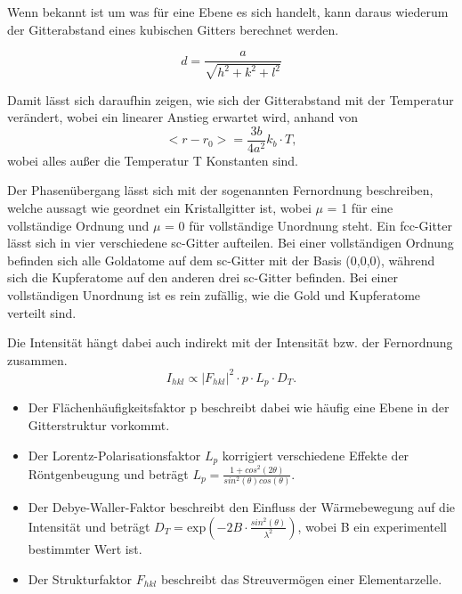 \documentclass[
	a4paper,
	12pt,
	pagesize,
	ngerman
]{scrartcl}
\begin{document}
Wenn bekannt ist um was für eine Ebene es sich handelt, kann daraus wiederum der Gitterabstand eines kubischen Gitters berechnet werden.

\begin{equation}
d = \frac{a}{\sqrt{h^{2}+k^{2}+l^{2}}}
\label{d}
\end{equation}

Damit lässt sich daraufhin zeigen, wie sich der Gitterabstand mit der Temperatur verändert, wobei ein linearer Anstieg erwartet wird, anhand von 
\begin{equation}
<r-r_{0}> = \frac{3 b}{4 a^{2}} k_{b} \cdot T, 
\label{Temp}
\end{equation}
wobei alles außer die Temperatur T Konstanten sind.

Der Phasenübergang lässt sich mit der sogenannten Fernordnung beschreiben, welche aussagt wie geordnet ein Kristallgitter ist, wobei $\mu$ = 1 für eine vollständige Ordnung und $\mu$ = 0 für vollständige Unordnung steht. Ein fcc-Gitter lässt sich in vier verschiedene sc-Gitter aufteilen. Bei einer vollständigen Ordnung befinden sich alle Goldatome auf dem sc-Gitter mit der Basis (0,0,0), während sich die Kupferatome auf den anderen drei sc-Gitter befinden.
Bei einer vollständigen Unordnung ist es rein zufällig, wie die Gold und Kupferatome verteilt sind.

Die Intensität hängt dabei auch indirekt mit der Intensität bzw. der Fernordnung zusammen.
\begin{equation}
I_{hkl} \propto |F_{hkl}|^{2} \cdot p \cdot L_{p} \cdot D_{T}.
\end{equation}

\begin{itemize}


\item Der Flächenhäufigkeitsfaktor p beschreibt dabei wie häufig eine Ebene in der Gitterstruktur vorkommt.

\item Der Lorentz-Polarisationsfaktor $L_{p}$ korrigiert verschiedene Effekte der Röntgenbeugung und beträgt $L_{p} =\frac{1 + cos^{2}(2 \theta)}{sin^{2}(\theta) cos(\theta)}$. 

\item Der Debye-Waller-Faktor beschreibt den Einfluss der Wärmebewegung auf die Intensität und beträgt $D_{T} = \text{exp}(-2B \cdot \frac{sin^{2}(\theta)}{\lambda^{2}})$, wobei B ein experimentell bestimmter Wert ist.

\item Der Strukturfaktor $F_{hkl}$ beschreibt das Streuvermögen einer Elementarzelle.
\end{itemize}
\end{document}

